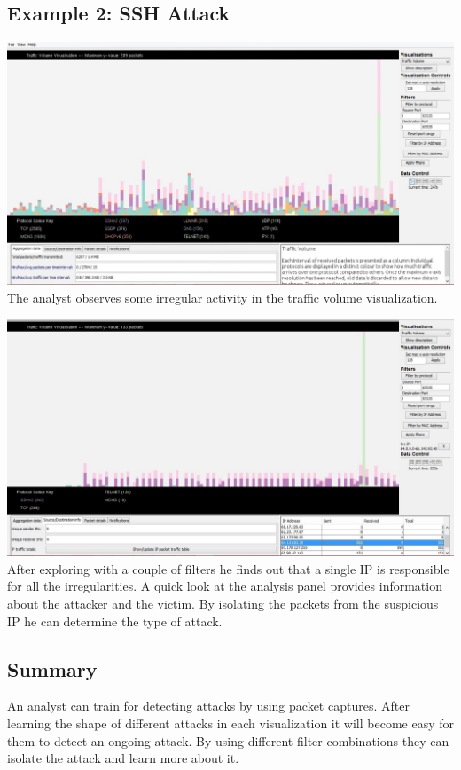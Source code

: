 \subsection{Example 2: SSH Attack}

\includegraphics[width=\linewidth]{materials/ssh_suspicious.jpg}
The analyst observes some irregular activity in the traffic volume visualization.

\includegraphics[width=\linewidth]{materials/ssh_explore.jpg}
After exploring with a couple of filters he finds out that a single IP is responsible for all the irregularities. A quick look at the analysis panel provides information about the attacker and the victim. By isolating the packets from the suspicious IP he can determine the type of attack.

\subsection{Summary}
An analyst can train for detecting attacks by using packet captures. After learning the shape of different attacks in each visualization it will become easy for them to detect an ongoing attack. By using different filter combinations they can isolate the attack and learn more about it.

